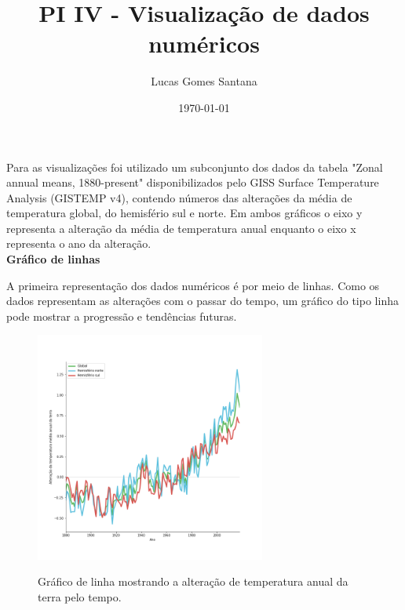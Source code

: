 \documentclass[12pt]{article}
\title{PI IV - Visualização de dados numéricos}
\author{Lucas Gomes Santana}
\date{\today}
\begin{document}
\maketitle

Para as visualizações foi utilizado um subconjunto dos dados da tabela "Zonal annual means, 1880-present" disponibilizados pelo GISS Surface Temperature Analysis (GISTEMP v4)\cite{gistemp}, contendo números das alterações da média de temperatura global, do hemisfério sul e norte. Em ambos gráficos o eixo y representa a alteração da média de temperatura anual enquanto o eixo x representa o ano da alteração.\\


\textbf{\Large Gráfico de linhas}\par
A primeira representação dos dados numéricos é por meio de linhas.  Como os dados representam as alterações com o passar do tempo, um gráfico do tipo linha pode mostrar a progressão e tendências futuras.
\setcounter{figure}{0}
\begin{figure}[H]
\centering
\includegraphics[width = 0.675\textwidth]{lines.png}
\label{fig:A.1}
\caption{Gráfico de linha mostrando a alteração de temperatura anual da terra pelo tempo.}
\end{figure}
\end{document}
